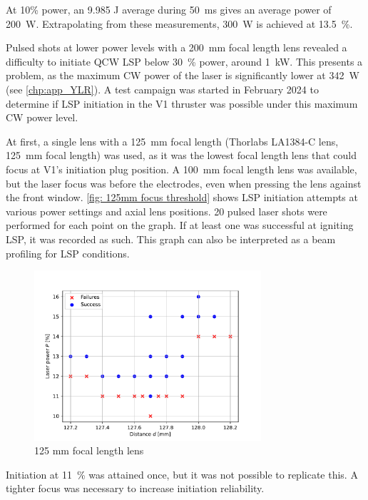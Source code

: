             At 10\% power, an 9.985 J average during \qty{50}{ms} gives an average power of \qty{200}{W}. Extrapolating from these measurements, \qty{300}{W} is achieved at \qty{13.5}{\%}.

            Pulsed shots at lower power levels with a \qty{200}{mm} focal length lens revealed a difficulty to initiate QCW LSP below \qty{30}{\%} power, around \qty{1}{kW}. This presents a problem, as the maximum CW power of the laser is significantly lower at \qty{342}{W} (see \autoref{chp:app_YLR}). A test campaign was started in February 2024 to determine if LSP initiation in the V1 thruster was possible under this maximum CW power level.

            At first, a single lens with a \qty{125}{mm} focal length (Thorlabs LA1384-C lens, \qty{125}{mm} focal length) was used, as it was the lowest focal length lens that could focus at V1's initiation plug position. A \qty{100}{mm} focal length lens was available, but the laser focus was before the electrodes, even when pressing the lens against the front window. \autoref{fig: 125mm focus threshold} shows LSP initiation attempts at various power settings and axial lens positions. 20 pulsed laser shots were performed for each point on the graph. If at least one was successful at igniting LSP, it was recorded as such. This graph can also be interpreted as a beam profiling for LSP conditions.
            \begin{figure}[!ht]
                \centering
                \includegraphics[width=0.75\textwidth]{assets/4 experiments/125mm_focus_threshold.pdf}
                \caption{125 mm focal length lens}
                \label{fig: 125mm focus threshold}
            \end{figure}
             Initiation at \qty{11}{\%} was attained once, but it was not possible to replicate this. A tighter focus was necessary to increase initiation  reliability.


